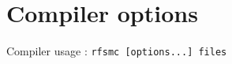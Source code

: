 \chapter{Compiler options}
\label{cha:compiler-options}

Compiler usage : \verb|rfsmc [options...] files|

\medskip
\begin{tabular}[c]{ll}

\end{tabular}

\normalsize

